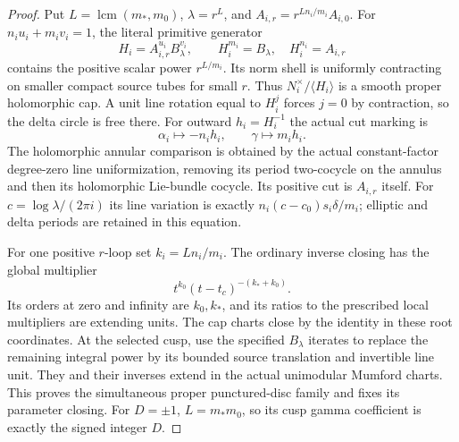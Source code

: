 \begin{proof}
Put $L=\operatorname{lcm}(m_*,m_0)$, $\lambda=r^L$, and
$A_{i,r}=r^{Ln_i/m_i}A_{i,0}$. For $n_iu_i+m_iv_i=1$,
the literal primitive generator
\[
 H_i=A_{i,r}^{u_i}B_\lambda^{v_i},\qquad
 H_i^{m_i}=B_\lambda,\quad H_i^{n_i}=A_{i,r}
\]
contains the positive scalar power $r^{L/m_i}$. Its norm shell
is uniformly contracting on smaller compact source tubes for
small $r$. Thus $N_i^\times/\langle H_i\rangle$ is a smooth
proper holomorphic cap. A unit line rotation equal to $H_i^j$
forces $j=0$ by contraction, so the delta circle is free there.
For outward $h_i=H_i^{-1}$ the actual cut marking is
\[
                 \alpha_i\longmapsto-n_i h_i,\qquad
                 \gamma\longmapsto m_i h_i.          \tag{F47.8}
\]
The holomorphic annular comparison is obtained by the actual
constant-factor degree-zero line uniformization, removing its
period two-cocycle on the annulus and then its holomorphic
Lie-bundle cocycle. Its positive cut is $A_{i,r}$ itself.
For $c=\log\lambda/(2\pi i)$ its line variation is exactly
$n_i(c-c_0)s_i\delta/m_i$; elliptic and delta periods are
retained in this equation.

For one positive $r$-loop set $k_i=Ln_i/m_i$. The ordinary
inverse closing has the global multiplier
\[
                 t^{k_0}(t-t_c)^{-(k_*+k_0)}.         \tag{F47.9}
\]
Its orders at zero and infinity are $k_0,k_*$, and its ratios
to the prescribed local multipliers are extending units.
The cap charts close by the identity in these root coordinates.
At the selected cusp, use the specified $B_\lambda$ iterates
to replace the remaining integral power by its bounded source
translation and invertible line unit. They and their inverses
extend in the actual unimodular Mumford charts. This proves
the simultaneous proper punctured-disc family and fixes its
parameter closing. For $D=\pm1$, $L=m_*m_0$, so its cusp
gamma coefficient is exactly the signed integer $D$.


\end{proof}
